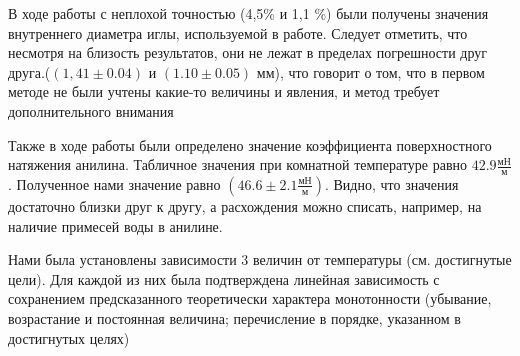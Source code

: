 \documentclass[12pt,a4paper]{article}
\begin{document}
В ходе работы с неплохой точностью (4,5\% и 1,1 \%) были получены значения внутреннего диаметра иглы, используемой в работе. Следует отметить, что несмотря на близость результатов, они не лежат в пределах погрешности друг друга.($(1,41 \pm 0.04)$ и $(1.10 \pm 0.05)$ мм), что говорит о том, что в первом методе не были учтены какие-то величины и явления, и метод требует дополнительного внимания

Также в ходе работы были определено значение коэффициента поверхностного натяжения анилина. Табличное значения при комнатной температуре равно $42.9 \frac{\text{мН}}{м}$. Полученное нами значение равно $(46.6 \pm 2.1 \frac{\text{мН}}{м})$. Видно, что значения достаточно близки друг к другу, а расхождения можно списать, например, на наличие примесей воды в анилине.

Нами была установлены зависимости 3 величин от температуры (см. достигнутые цели). Для каждой из них была подтверждена линейная зависимость с сохранением предсказанного теоретически характера монотонности (убывание, возрастание и постоянная величина; перечисление в порядке, указанном в достигнутых целях)
\end{document}

